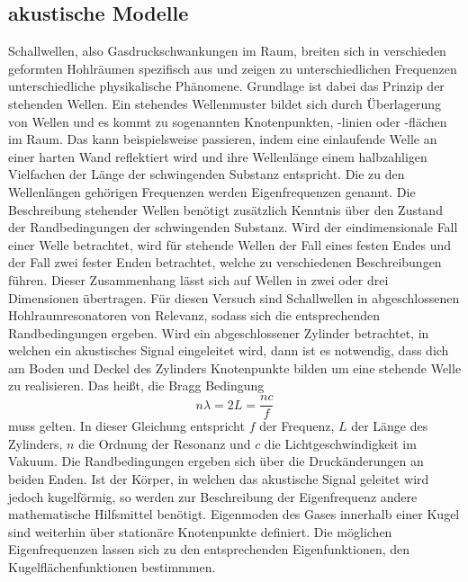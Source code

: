 \subsection{akustische Modelle}
Schallwellen, also Gasdruckschwankungen im Raum, breiten sich in verschieden geformten 
Hohlräumen spezifisch aus und zeigen zu unterschiedlichen Frequenzen unterschiedliche 
physikalische Phänomene. Grundlage ist dabei das Prinzip der stehenden Wellen.
Ein stehendes Wellenmuster bildet sich durch Überlagerung von Wellen und es kommt zu 
sogenannten Knotenpunkten, -linien oder -flächen im Raum. Das kann beispielsweise 
passieren, indem eine einlaufende Welle an einer harten Wand reflektiert wird und ihre 
Wellenlänge einem halbzahligen Vielfachen der Länge der schwingenden Substanz entspricht.
Die zu den Wellenlängen gehörigen Frequenzen werden Eigenfrequenzen genannt.
Die Beschreibung stehender Wellen benötigt zusätzlich Kenntnis über den Zustand der 
Randbedingungen der schwingenden Substanz.
Wird der eindimensionale Fall einer Welle betrachtet, wird für stehende Wellen der Fall 
eines festen Endes und der Fall zwei fester Enden betrachtet, welche zu verschiedenen 
Beschreibungen führen. Dieser Zusammenhang lässt 
sich auf Wellen in zwei oder drei Dimensionen übertragen. Für diesen Versuch sind 
Schallwellen in abgeschlossenen Hohlraumresonatoren von Relevanz, sodass
sich die entsprechenden Randbedingungen ergeben.
Wird ein abgeschlossener Zylinder betrachtet, in welchen ein akustisches Signal 
eingeleitet wird, dann ist es notwendig, dass dich am Boden und Deckel des Zylinders 
Knotenpunkte bilden um eine stehende Welle zu realisieren. Das heißt, die 
Bragg Bedingung 
\begin{equation}
    n\lambda = 2 L = \frac{nc}{f}
    \label{bragg}
\end{equation}
muss gelten. In dieser Gleichung entspricht $f$ der Frequenz, $L$ der Länge des 
Zylinders, $n$ die Ordnung der Resonanz und $c$ die Lichtgeschwindigkeit im Vakuum.
Die Randbedingungen ergeben 
sich über die Druckänderungen an beiden Enden.
Ist der Körper, in welchen das akustische Signal geleitet wird jedoch kugelförmig, so 
werden zur Beschreibung der Eigenfrequenz andere mathematische Hilfsmittel benötigt.
Eigenmoden des Gases innerhalb einer Kugel sind weiterhin über stationäre Knotenpunkte 
definiert. Die möglichen Eigenfrequenzen lassen sich zu den entsprechenden 
Eigenfunktionen, den Kugelflächenfunktionen bestimmmen. 

